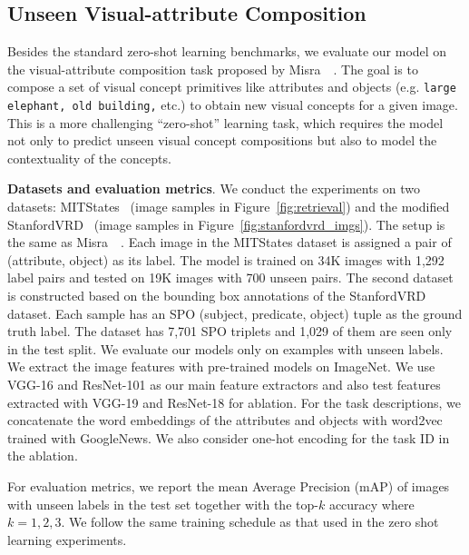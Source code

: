 \documentclass[10pt,twocolumn,letterpaper]{article}
\newcommand\minisection[1]{\vspace{2mm}\noindent \textbf{#1}}
\begin{document}
\subsection{Unseen Visual-attribute Composition}
\label{sec:concept}
Besides the standard zero-shot learning benchmarks, we evaluate our model on the visual-attribute composition task proposed by Misra~\etal~\cite{misra2017red}. The goal is to compose a set of visual concept primitives like attributes 
and objects (e.g. \texttt{large elephant, old building,} etc.) to obtain new visual concepts for a given image. This is a more challenging ``zero-shot'' learning task,  which requires the model not only to predict unseen visual concept compositions but also to model the contextuality of the concepts. 



\minisection{Datasets and evaluation metrics}. We conduct the experiments on two
datasets: MITStates~\cite{StatesAndTransformations} (image samples in Figure~\ref{fig:retrieval}) and
the modified StanfordVRD~\cite{lu2016visual} (image samples in Figure~\ref{fig:stanfordvrd_imgs}). The setup is the same as Misra~\etal~\cite{misra2017red}.
Each image in the MITStates dataset is assigned a pair of (attribute, object) as
its label. The model is trained on 34K images with 1,292 label pairs and tested on
19K images with 700 unseen pairs. The second dataset is constructed based on 
the bounding box annotations of the StanfordVRD dataset. Each sample has an SPO (subject, predicate, object)
tuple as the ground truth label.  The dataset has 7,701 SPO triplets and 1,029 of them
are seen only in the test split. We evaluate our models only on examples with unseen
labels. We extract the image features with
pre-trained models on ImageNet. We use VGG-16 and ResNet-101 as our main
feature extractors and also test features extracted 
with VGG-19 and ResNet-18 for ablation. 
For the task descriptions, we concatenate the word embeddings of the attributes
and objects with word2vec~\cite{mikolov2013efficient} trained with GoogleNews. We also consider one-hot encoding for the task ID in the ablation. 

For evaluation metrics, we report the mean Average Precision (mAP) of images 
with unseen labels in the test set together with the top-$k$ accuracy where
$k=1,2,3$. We follow the same training schedule as that used in the zero shot learning experiments.
\end{document}
